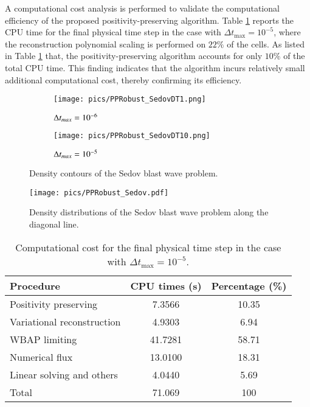 A computational cost analysis is performed to validate the computational efficiency of the proposed positivity-preserving algorithm. Table \ref{tab:cpu-time-cost} reports the CPU time for the final physical time step in the case with $\Delta t_{\text{max}} = 10^{-5}$, where the reconstruction polynomial scaling is performed on $22\%$ of the cells. As listed in Table \ref{tab:cpu-time-cost} that, the positivity-preserving algorithm accounts for only $10\%$ of the total CPU time.
This finding indicates that the algorithm incurs relatively small additional computational cost, thereby confirming its efficiency.

\begin{figure}[htbp]
    \centering
    \begin{subfigure}{0.5\textwidth}
        \texttt{[image: pics/PPRobust\_SedovDT1.png]}
        \caption[]{$\mathrm\Delta t_{max}=10^{-6}$}
    \end{subfigure}\hfill
    \begin{subfigure}{0.5\textwidth}
        \texttt{[image: pics/PPRobust\_SedovDT10.png]}
        \caption[]{$\mathrm\Delta t_{max}=10^{-5}$}
    \end{subfigure}
    \caption{Density contours of the Sedov blast wave problem.}
    \label{fig:sedov}
\end{figure}

\begin{figure}[htbp]
    \centering
    \texttt{[image: pics/PPRobust\_Sedov.pdf]}
    \caption{Density distributions of the Sedov blast wave problem along the diagonal line.}
    \label{fig:sedovLine}
\end{figure}

\begin{table}[htbp!]
    \centering
    \caption{Computational cost for the final physical time step in the case with $\Delta t_{\text{max}} = 10^{-5}$.}
    \label{tab:cpu-time-cost}
    \setlength{\tabcolsep}{12.5pt} %
    \renewcommand{\arraystretch}{1.2}
    \begin{tabular}{l c c}
        \toprule
        Procedure & CPU times (s) & Percentage (\%) \\
        \midrule
        Positivity preserving & 7.3566 & 10.35\\
        Variational reconstruction & 4.9303 & 6.94\\
        WBAP limiting & 41.7281 & 58.71\\
        Numerical flux & 13.0100 & 18.31\\
        Linear solving and others &  4.0440 & 5.69\\
        \midrule
        {Total} & 71.069 & 100 \\
    \bottomrule
    \end{tabular}
\end{table}

